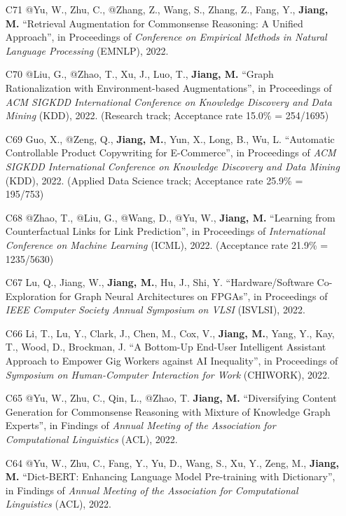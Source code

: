 \documentclass[10pt]{article}
\newenvironment{myindentpar}[1]%
{\begin{list}{}%
         {\setlength{\leftmargin}{#1}}%
         \item[]%
}
{\end{list}}
\newcounter{list}
\begin{document}
\begin{myindentpar}{0.00cm}
\begin{enumerate}[leftmargin=.5cm]
\item[C71] @Yu, W., Zhu, C., @Zhang, Z., Wang, S., Zhang, Z., Fang, Y., \textbf{Jiang, M.} ``Retrieval Augmentation for Commonsense Reasoning: A Unified Approach'', in Proceedings of \textit{Conference on Empirical Methods in Natural Language Processing} (EMNLP), 2022.

\item[C70] @Liu, G., @Zhao, T., Xu, J., Luo, T., \textbf{Jiang, M.} ``Graph Rationalization with Environment-based Augmentations'', in Proceedings of \textit{ACM SIGKDD International Conference on Knowledge Discovery and Data Mining} (KDD), 2022. (Research track; Acceptance rate 15.0\% = 254/1695)

\item[C69] Guo, X., @Zeng, Q., \textbf{Jiang, M.}, Yun, X., Long, B., Wu, L. ``Automatic Controllable Product Copywriting for E-Commerce'', in Proceedings of \textit{ACM SIGKDD International Conference on Knowledge Discovery and Data Mining} (KDD), 2022. (Applied Data Science track; Acceptance rate 25.9\% = 195/753)

\item[C68] @Zhao, T., @Liu, G., @Wang, D., @Yu, W., \textbf{Jiang, M.} ``Learning from Counterfactual Links for Link Prediction'', in Proceedings of \textit{International Conference on Machine Learning} (ICML), 2022. (Acceptance rate 21.9\% = 1235/5630)

\item[C67] Lu, Q., Jiang, W., \textbf{Jiang, M.}, Hu, J., Shi, Y. ``Hardware/Software Co-Exploration for Graph Neural Architectures on FPGAs'', in Proceedings of \textit{IEEE Computer Society Annual Symposium on VLSI} (ISVLSI), 2022.

\item[C66] Li, T., Lu, Y., Clark, J., Chen, M., Cox, V., \textbf{Jiang, M.}, Yang, Y., Kay, T., Wood, D., Brockman, J. ``A Bottom-Up End-User Intelligent Assistant Approach to Empower Gig Workers against AI Inequality'', in Proceedings of \textit{Symposium on Human-Computer Interaction for Work} (CHIWORK), 2022.
		
\item[C65] @Yu, W., Zhu, C., Qin, L., @Zhao, T. \textbf{Jiang, M.} ``Diversifying Content Generation for Commonsense Reasoning with Mixture of Knowledge Graph Experts'', in Findings of \textit{Annual Meeting of the Association for Computational Linguistics} (ACL), 2022.

\item[C64] @Yu, W., Zhu, C., Fang, Y., Yu, D., Wang, S., Xu, Y., Zeng, M., \textbf{Jiang, M.} ``Dict-BERT: Enhancing Language Model Pre-training with Dictionary'', in Findings of \textit{Annual Meeting of the Association for Computational Linguistics} (ACL), 2022.


\end{enumerate}
\end{myindentpar}
\end{document}
